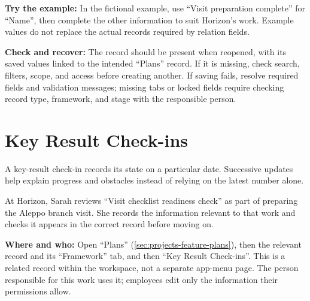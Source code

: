 \textbf{Try the example:} In the fictional example, use “Visit preparation complete” for “Name”, then complete the other information to suit Horizon's work. Example values do not replace the actual records required by relation fields.

\textbf{Check and recover:} The record should be present when reopened, with its saved values linked to the intended “Plans” record. If it is missing, check search, filters, scope, and access before creating another. If saving fails, resolve required fields and validation messages; missing tabs or locked fields require checking record type, framework, and stage with the responsible person.

\clearpage
\section{Key Result Check-ins}
\label{sec:projects-feature-planning-key-result-checkins}

A key-result check-in records its state on a particular date. Successive updates help explain progress and obstacles instead of relying on the latest number alone.

\begin{rcnote}
At Horizon, Sarah reviews “Visit checklist readiness check” as part of preparing the Aleppo branch visit. She records the information relevant to that work and checks it appears in the correct record before moving on.
\end{rcnote}

\textbf{Where and who:} Open “Plans” (\ref{sec:projects-feature-plans}), then the relevant record and its “Framework” tab, and then “Key Result Check-ins”. This is a related record within the workspace, not a separate app-menu page. The person responsible for this work uses it; employees edit only the information their permissions allow.

